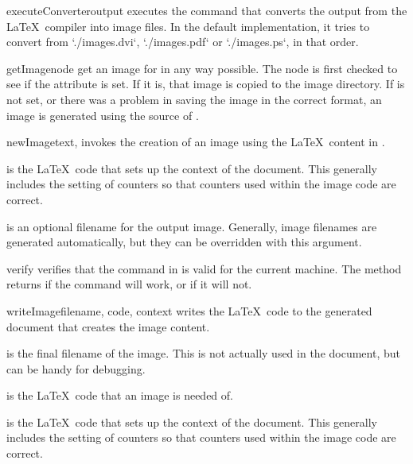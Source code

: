 \begin{methoddesc}[Imager]{executeConverter}{output}
executes the command that converts the output from the \LaTeX\ compiler
into image files. In the default implementation, it tries to convert from
`./images.dvi`, `./images.pdf` or `./images.ps`, in that order.
\end{methoddesc}

\begin{methoddesc}[Imager]{getImage}{node}
get an image for  in any way possible.  The node is first checked
to see if the  attribute is set.  If it is, that 
image is copied to the image directory.  If  is
not set, or there was a problem in saving the image in the correct format,
an image is generated using the source of .
\end{methoddesc}

\begin{methoddesc}[Imager]{newImage}{text, }
invokes the creation of an image using the \LaTeX\ content in .

 is the \LaTeX\ code that sets up the context of the document.
This generally includes the setting of counters so that counters used
within the image code are correct.

 is an optional filename for the output image.  Generally, 
image filenames are generated automatically, but they can be overridden
with this argument.
\end{methoddesc}

\begin{methoddesc}[Imager]{verify}{}
verifies that the command in  is valid for the current
machine.  The  method returns  if the command will
work, or  if it will not.
\end{methoddesc}

\begin{methoddesc}[Imager]{writeImage}{filename, code, context}
writes the \LaTeX\ code to the generated document that creates the 
image content.

 is the final filename of the image.  This is not actually
used in the document, but can be handy for debugging.

 is the \LaTeX\ code that an image is needed of.

 is the \LaTeX\ code that sets up the context of the document.
This generally includes the setting of counters so that counters used
within the image code are correct.
\end{methoddesc}

